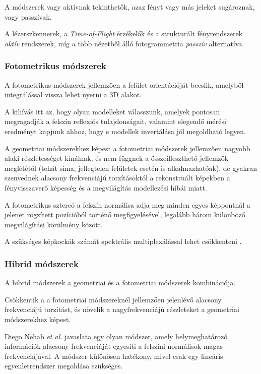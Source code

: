 \documentclass[12pt,a4]{article}
\begin{document}
	 A módszerek vagy aktívnak tekinthetők, azaz fényt
	vagy más jeleket sugároznak, vagy passzívak.
	
	
	A lézerszkennerek, a \textit{Time-of-Flight} érzékelők és a strukturált fényrendszerek \textit{aktív} rendszerek, míg a több nézetből álló fotogrammetria \textit{passzív} alternatíva.
	
	\subsubsection{Fotometrikus módszerek}
	A fotometrikus módszerek \cite{3dmm} jellemzően a felület orientációját becslik, amelyből integrálással vissza lehet nyerni a 3D alakot.
	
	 A kihívás itt az, hogy olyan modelleket válasszunk, amelyek pontosan megragadják a felszín reflexiós tulajdonságait, valamint elegendő mérési eredményt kapjunk ahhoz, hogy e modellek invertálása jól megoldható legyen. 
	 
	 
	 A geometriai módszerekhez képest a fotometriai módszerek
	 jellemzően nagyobb alaki részletességet kínálnak, és nem függnek a
	 összeilleszthető jellemzők meglététől
	(tehát sima, jellegtelen felületek esetén is alkalmazhatóak), de gyakran szenvednek alacsony frekvenciájú torzításoktól a rekonstruált képekben
	a fényvisszaverő képesség és a megvilágítás modellezési hibái miatt.
	
	
	A fotometrikus sztereó \cite{photometric} a felszín normálisa adja meg minden egyes képpontnál a jelenet rögzített pozícióból történő megfigyelésével, legalább három különböző megvilágítási körülmény között.
	
	 A szükséges képkockák számát spektrális multiplexálással lehet csökkenteni \cite{multiplex}.
	
	\subsubsection{Hibrid módszerek}
	A hibrid módszerek \cite{3dmm} a
	geometriai és a fotometriai módszerek kombinációja. 
	
	Csökkentik a
	a fotometriai módszereknél jellemzően jelenlévő alacsony frekvenciájú torzítást, és
	növelik a nagyfrekvenciájú részleteket a geometriai módszerekhez képest. 
	
	Diego Nehab \textit{et al}. \cite{hibrid} javaslata egy olyan módszer, amely helymeghatározó információk alacsony frekvenciáját egyesíti a felszíni normálisok magas frekvenciájával. 
	A módszer különösen hatékony, mivel csak egy lineáris egyenletrendszer megoldása szükséges. 
	
\end{document}
